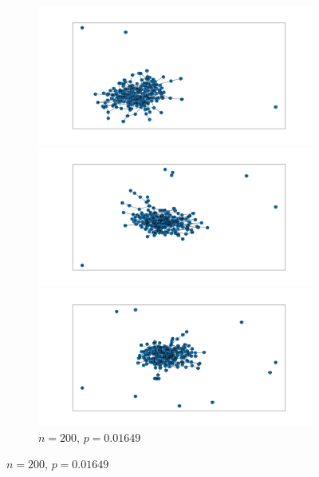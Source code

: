\documentclass{article}
\begin{document}
\begin{figure}[htb]
    \centering
    \begin{subfigure}{\textwidth}
        \centering
        \begin{minipage}{0.32\textwidth}
            \centering
            \includegraphics[width=\linewidth]{images/erdos_renyi/n200_p0.016491586832740178_0.png}
        \end{minipage}\hfill
        \begin{minipage}{0.32\textwidth}
            \centering
            \includegraphics[width=\linewidth]{images/erdos_renyi/n200_p0.016491586832740178_1.png}
        \end{minipage}\hfill
        \begin{minipage}{0.32\textwidth}
            \centering
            \includegraphics[width=\linewidth]{images/erdos_renyi/n200_p0.016491586832740178_2.png}
        \end{minipage}
        \caption{$n=200$, $p=0.01649$}
    \end{subfigure}


\end{figure}
\end{document}
